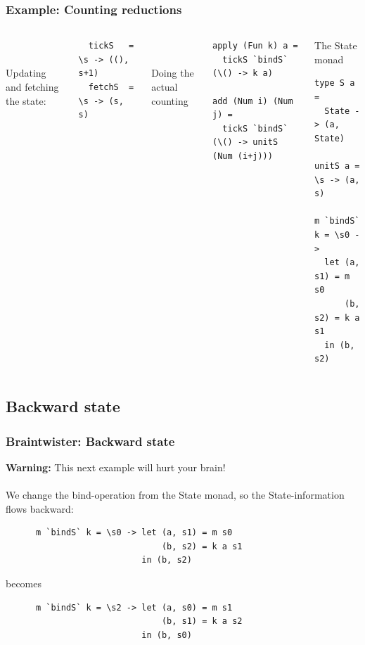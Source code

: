 \documentclass{beamer}
\begin{document}
\begin{frame}[t, fragile]
  \frametitle{Example: Counting reductions}

  \begin{columns}[t]
\quad \\
\quad \\

Updating and fetching the state:
\begin{lstlisting}
  tickS   =  \s -> ((), s+1)
  fetchS  =  \s -> (s, s)
\end{lstlisting}
\quad \\
\quad \\

Doing the actual counting
\begin{lstlisting}
apply (Fun k) a = 
  tickS `bindS` (\() -> k a)

add (Num i) (Num j) = 
  tickS `bindS` (\() -> unitS (Num (i+j)))
\end{lstlisting}

\begin{block}{The State monad}

\color{kugrey}
\begin{lstlisting}[basicstyle=\footnotesize\ttfamily]
type S a = 
  State -> (a, State)

unitS a = \s -> (a, s)

m `bindS` k = \s0 -> 
  let (a, s1) = m s0
      (b, s2) = k a s1
  in (b, s2)
\end{lstlisting}
\end{block}
\end{columns}
\end{frame}

\subsection{Backward state}
\begin{frame}[t, fragile]
\frametitle{Braintwister: Backward state}
\textbf{Warning:} This next example will hurt your brain!\\
\quad \\

We change the bind-operation from the State monad, so the
State-information flows backward:
    \begin{lstlisting}
      m `bindS` k = \s0 -> let (a, s1) = m s0
                               (b, s2) = k a s1
                           in (b, s2)
    \end{lstlisting}

becomes
    \begin{lstlisting}
      m `bindS` k = \s2 -> let (a, s0) = m s1
                               (b, s1) = k a s2
                           in (b, s0)
    \end{lstlisting}


\end{frame}
\end{document}
